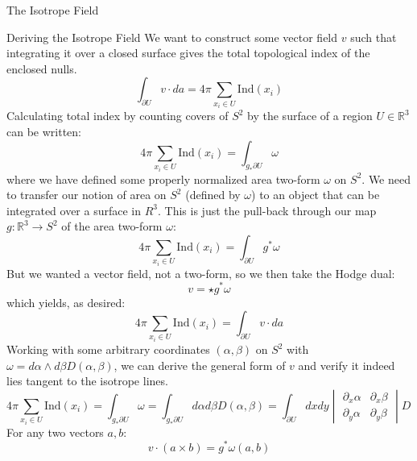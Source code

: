 \documentclass[final]{beamer}
\newlength{\onecolwid}
\begin{document}
\begin{frame}[t]
\begin{columns}[t]
\begin{column}{\onecolwid}
\begin{block}{\huge{The Isotrope Field}}
\begin{block}{Deriving the Isotrope Field}
  We want to construct some vector field $v$ such that integrating it over a closed surface
  gives the total topological index of the enclosed nulls.
  {\large
  \begin{equation}
    \boxed{\int_{\partial U}v\cdot da=4\pi\sum_{x_i\in U}\mathrm{Ind}(x_i)}
  \end{equation}
  }
  Calculating total index by counting covers of $S^2$ by the surface of a region $U\in\mathbb{R}^3$
  can be written:
  \begin{equation}
    4\pi\sum_{x_i\in U}\mathrm{Ind}(x_i)=\int_{g_*\partial U}\omega
  \end{equation}
  where we have defined some properly normalized area two-form $\omega$ on $S^2$.
  We need to transfer our notion of area on $S^2$ (defined by $\omega$)
  to an object that can be integrated over a surface in $R^3$.
  This is just the pull-back through our map $g:\mathbb{R}^3\rightarrow S^2$
  of the area two-form $\omega$:
  \begin{equation}
    4\pi\sum_{x_i\in U}\mathrm{Ind}(x_i)=\int_{\partial U}g^*\omega
  \end{equation}
  But we wanted a vector field, not a two-form, so we then take the Hodge dual:
  \begin{equation}
    v=\star g^*\omega
  \end{equation}
  which yields, as desired:
  \begin{equation}
    4\pi\sum_{x_i\in U}\mathrm{Ind}(x_i)=\int_{\partial U}v\cdot da
  \end{equation}
  Working with some arbitrary coordinates $(\alpha,\beta)$
  on $S^2$ with $\omega=d\alpha\wedge d\beta D(\alpha,\beta)$,
  we can derive the general form of $v$
  and verify it indeed lies tangent to the isotrope lines.
  \begin{equation}
    4\pi\sum_{x_i\in U}\mathrm{Ind}(x_i)
    =\int_{g_*\partial U}\omega
    =\int_{g_*\partial U}d\alpha d\beta D(\alpha,\beta)
    =\int_{\partial U}dxdy
    \begin{vmatrix}
      \partial_x\alpha & \partial_x \beta \\
      \partial_y\alpha & \partial_y \beta
    \end{vmatrix}
    D(\alpha,\beta)
    =\int_{\partial U}v\cdot da
  \end{equation}
  For any two vectors $a,b$:
  \begin{equation}
    v\cdot(a\times b)
    =g^*\omega(a,b)

\end{equation}
\end{block}
\end{block}
\end{column}
\end{columns}
\end{frame}
\end{document}
